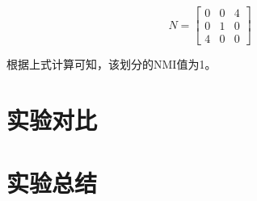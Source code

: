 \begin{equation}
  \label{eqn:n}
  N=\begin{bmatrix}
    0 & 0 &4 \\ 
    0 & 1 & 0\\ 
    4 & 0 & 0
    \end{bmatrix}
\end{equation}

根据上式计算可知，该划分的NMI值为1。

\section{实验对比}


\section{实验总结}


